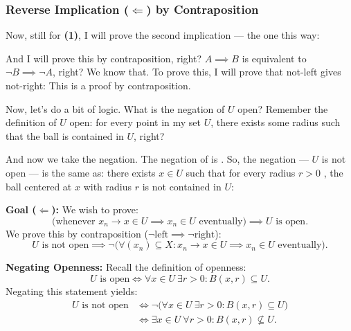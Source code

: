 \begin{proofWrapper}
\subsubsection{Reverse Implication (\texorpdfstring{$\Leftarrow$}{<=}) by Contraposition}

\begin{speech}[00:46:58 - 00:48:45]
Now, still for \textbf{(1)}, I will prove the second implication --- the one this way: 

And I will prove this by contraposition, right? $A \implies B$ is equivalent to $\neg B \implies \neg A$, right? We know that. To prove this, I will prove that not-left gives not-right:  This is a proof by contraposition.

Now, let's do a bit of logic. What is the negation of $U$ open? Remember the definition of $U$ open: for every point in my set $U$, there exists some radius such that the ball is contained in $U$, right?

And now we take the negation. The negation of  is . So, the negation --- $U$ is not open --- is the same as: there exists $x \in U$  such that for every radius $r > 0$ , the ball centered at $x$ with radius $r$ is not contained in $U$: 
\end{speech}

\begin{content}
\textbf{Goal ($\Leftarrow$):} We wish to prove:
\[
\bigl( \text{whenever } x_n \to x \in U \implies x_n \in U \text{ eventually} \bigr) \implies U \text{ is open}.
\]
We prove this by contraposition ($\neg \text{left} \implies \neg \text{right}$):
\[
U \text{ is not open} \implies \neg \bigl( \forall (x_n) \subseteq X \colon x_n \to x \in U \implies x_n \in U \text{ eventually} \bigr).
\]

\textbf{Negating Openness:}
Recall the definition of openness:
\[
U \text{ is open} \iff \forall x \in U \ \exists r > 0 \colon B(x, r) \subseteq U.
\]
Negating this statement yields:
\begin{align}
U \text{ is not open} &\iff \neg \bigl( \forall x \in U \ \exists r > 0 \colon B(x, r) \subseteq U \bigr) \nonumber \\
&\iff \exists x \in U \ \forall r > 0 \colon B(x, r) \not\subseteq U. \label{eq:negation-openness}
\end{align}
\end{content}


\end{proofWrapper}
